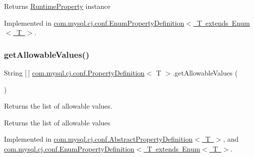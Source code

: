\begin{DoxyReturn}{Returns}
\mbox{\hyperlink{interfacecom_1_1mysql_1_1cj_1_1conf_1_1_runtime_property}{Runtime\+Property}} instance 
\end{DoxyReturn}


Implemented in \mbox{\hyperlink{classcom_1_1mysql_1_1cj_1_1conf_1_1_enum_property_definition_a463e1e063d6969ca3d352b31ea9324b5}{com.\+mysql.\+cj.\+conf.\+Enum\+Property\+Definition$<$ T extends Enum$<$ T $>$}}.

\mbox{\label{interfacecom_1_1mysql_1_1cj_1_1conf_1_1_property_definition_af0b3b3dc66dde20cb65b69eb2ec70738}} 
\subsubsection{\texorpdfstring{get\+Allowable\+Values()}{getAllowableValues()}}
{\footnotesize\ttfamily String \mbox{[}$\,$\mbox{]} \mbox{\hyperlink{interfacecom_1_1mysql_1_1cj_1_1conf_1_1_property_definition}{com.\+mysql.\+cj.\+conf.\+Property\+Definition}}$<$ T $>$.get\+Allowable\+Values (\begin{DoxyParamCaption}{ }\end{DoxyParamCaption})}

Returns the list of allowable values.

\begin{DoxyReturn}{Returns}
the list of allowable values 
\end{DoxyReturn}


Implemented in \mbox{\hyperlink{classcom_1_1mysql_1_1cj_1_1conf_1_1_abstract_property_definition_a3dc8d82d1870d9a7ad201b6552f77610}{com.\+mysql.\+cj.\+conf.\+Abstract\+Property\+Definition$<$ T $>$}}, and \mbox{\hyperlink{classcom_1_1mysql_1_1cj_1_1conf_1_1_enum_property_definition_a7e2ff8f6f7baf418abdae017a6bd8136}{com.\+mysql.\+cj.\+conf.\+Enum\+Property\+Definition$<$ T extends Enum$<$ T $>$}}.

\mbox{\label{interfacecom_1_1mysql_1_1cj_1_1conf_1_1_property_definition_a3def2907e92eb8015dcbe406d3a55a24}} 
